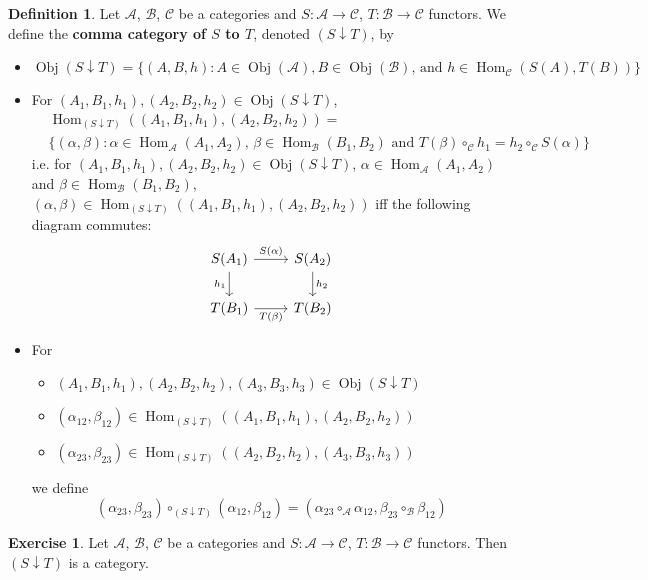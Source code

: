 \documentclass{book}
\theoremstyle{definition}
\newtheorem{defn}[definition]{Definition}
\newtheorem{ex}[definition]{Exercise}
\newcommand{\al}{\alpha}
\newcommand{\be}{\beta}
\newcommand{\MA}{\mathcal{A}}
\newcommand{\MB}{\mathcal{B}}
\newcommand{\MC}{\mathcal{C}}
\newcommand{\lex}[1]{\label{ex:#1}}
\newcommand{\ld}[1]{\label{defn:#1}}
\DeclareMathOperator{\Obj}{Obj}
\DeclareMathOperator{\Hom}{Hom}
\DeclareMathOperator*{\0}{\mbf{0}}
\DeclareMathOperator*{\1}{\mbf{1}}
\begin{document}
	
	\begin{defn} \ld{13011}
		Let $\MA$, $\MB$, $\MC$ be a categories and $S: \MA \rightarrow \MC$, $T: \MB \rightarrow \MC$ functors. We define the \textbf{comma category of $S$ to $T$}, denoted $(S \downarrow T)$, by 
		\begin{itemize}
			\item $\Obj(S \downarrow T) = \{(A, B, h): A \in \Obj(\MA), B \in \Obj(\MB) \text{, and } h \in \Hom_{\MC}(S(A), T(B))\}$
			\item For $(A_1, B_1, h_1), (A_2, B_2, h_2) \in \Obj(S \downarrow T)$, 
			\begin{align*}
				& \Hom_{(S \downarrow T)}((A_1, B_1, h_1), (A_2, B_2, h_2)) = \\
				& \{(\al, \be): \al \in \Hom_{\MA}(A_1, A_2) \text{, } \be \in \Hom_{\MB}(B_1, B_2) \text{ and } T(\be) \circ_{\MC} h_1 = h_2 \circ_{\MC} S(\al)\}
			\end{align*}
			i.e. for $(A_1, B_1, h_1), (A_2, B_2, h_2) \in \Obj(S \downarrow T)$, $\al \in \Hom_{\MA}(A_1, A_2)$ and $\be \in \Hom_{\MB}(B_1, B_2)$, $(\al, \be) \in \Hom_{(S \downarrow T)}((A_1, B_1, h_1), (A_2, B_2, h_2))$ iff the following diagram commutes:
			\[ 
			\begin{tikzcd}
				S(A_1) \arrow[r, "S(\al)"] \arrow[d, "h_1"'] & S(A_2)  \arrow[d, "h_2"] \\
				T(B_1) \arrow[r, "T(\be)"']                 & T(B_2)
			\end{tikzcd}
			\]
			\item For 
			\begin{itemize}
				\item $(A_1, B_1, h_1), (A_2, B_2, h_2), (A_3, B_3, h_3) \in \Obj(S \downarrow T)$
				\item $(\al_{12}, \be_{12}) \in \Hom_{(S \downarrow T)}((A_1, B_1, h_1), (A_2, B_2, h_2))$
				\item $(\al_{23}, \be_{23}) \in \Hom_{(S \downarrow T)}((A_2, B_2, h_2), (A_3, B_3, h_3))$
			\end{itemize}
			we define 
			$$(\al_{23}, \be_{23}) \circ_{(S \downarrow T)} (\al_{12}, \be_{12}) = (\al_{23} \circ_{\MA} \al_{12}, \be_{23} \circ_{\MB} \be_{12})$$
		\end{itemize}
	\end{defn}
	
	\begin{ex} \lex{13013}
		Let $\MA$, $\MB$, $\MC$ be a categories and $S: \MA \rightarrow \MC$, $T: \MB \rightarrow \MC$ functors. Then $(S \downarrow T)$ is a category.
	\end{ex}
	
\end{document}
